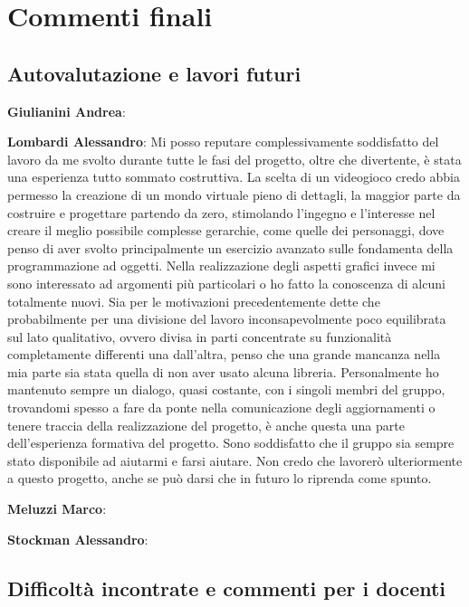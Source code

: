 \documentclass[a4paper,12pt, hidelinks]{report}
\begin{document}
\chapter{Commenti finali}


\section{Autovalutazione e lavori futuri}

	\item \textbf{Giulianini Andrea}:

	\item \textbf{Lombardi Alessandro}: Mi posso reputare complessivamente soddisfatto del lavoro da me svolto durante tutte le fasi del progetto, oltre che divertente, è stata una esperienza tutto sommato costruttiva. La scelta di un videogioco credo abbia permesso la creazione di un mondo virtuale pieno di dettagli, la maggior parte da costruire e progettare partendo da zero, stimolando l'ingegno e l'interesse nel creare il meglio possibile complesse gerarchie, come quelle dei personaggi, dove penso di aver svolto principalmente un esercizio avanzato sulle fondamenta della programmazione ad oggetti. Nella realizzazione degli aspetti grafici invece mi sono interessato ad argomenti più particolari o ho fatto la conoscenza di alcuni totalmente nuovi. Sia per le motivazioni precedentemente dette che probabilmente per una divisione del lavoro inconsapevolmente poco equilibrata sul lato qualitativo, ovvero divisa in parti concentrate su funzionalità completamente differenti una dall'altra, penso che una grande mancanza nella mia parte sia stata quella di non aver usato alcuna libreria. Personalmente ho mantenuto sempre un dialogo, quasi costante, con i singoli membri del gruppo, trovandomi spesso a fare da ponte nella comunicazione degli aggiornamenti o tenere traccia della realizzazione del progetto, è anche questa una parte dell'esperienza formativa del progetto. Sono soddisfatto che il gruppo sia sempre stato disponibile ad aiutarmi e farsi aiutare. Non credo che lavorerò ulteriormente a questo progetto, anche se può darsi che in futuro lo riprenda come spunto. 

	\item \textbf{Meluzzi Marco}: 

	\item \textbf{Stockman Alessandro}:

\section{Difficoltà incontrate e commenti per i docenti}
\end{document}
